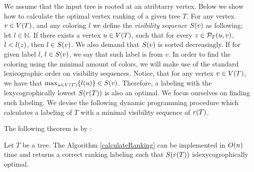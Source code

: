 We assume that the input tree is rooted at an atribtarry vertex.
Below we show how to calculate the optimal vertex ranking of a given tree $T$. For any vertex $v\in V\mathopen{}\left( T \right)$, and any coloring $l$ we define the \textit{visibility sequence} $S\mathopen{}\left( v \right)$ as following: let $l\in \mathbb{N}$. If there exists a vertex $u\in V\mathopen{}\left( T \right)$, such that for every $z\in\mathcal{P}_T\mathopen{}\left( u,v \right)$, $l< l\mathopen{}\left( z \right)$, then $l\in S\mathopen{}\left( v \right)$. We also demand that $S\mathopen{}\left( v \right)$ is sorted decreasingly. If for given label $l$, $l\in S\mathopen{}\left( v \right)$, we say that such label is  from $v$. In order to find the coloring using the minimal amount of colors, we will make use of the standard lexicographic order on visibility sequences. Notice, that for any vertex $v\in V\mathopen{}\left( T \right)$, we have that $\max_{u\in V\mathopen{}\left( T \right)}\mathopen{}\left\{ l\mathopen{}\left( u \right) \right\}\in S\mathopen{}\left( v \right)$. Therefore, a labeling with the lexycogrophically lowest $S\mathopen{}\left( r\mathopen{}\left( T \right) \right)$ is also an optimal. We focus ourselves on finding such labeling. We devise the following dynamic programming procedure which calculates a labeling of $T$ with a minimal visibility sequence of $r\mathopen{}\left( T \right)$.


The following theorem is by \cite{OnakParys2006GenOfBSSInTsAndFLikePosets}:
\begin{theorem}
    Let $T$ be a tree. The Algorithm \ref{calculateRanking} can be implemented in $O\mathopen{}\left( n \right)$ time and returns a correct ranking labeling such that $S\mathopen{}\left( r\mathopen{}\left( T \right) \right)$ islexycogrophically optimal.
\end{theorem}

